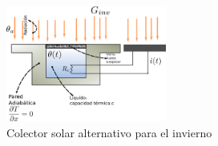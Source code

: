 \begin{figure}[H]
   \centering
   \includegraphics[width=0.47\textwidth]{Images/colector_esquema_invierno.eps}
   \caption{Colector solar alternativo para el invierno}\label{fig:colector_esquema_invierno}
\end{figure}

